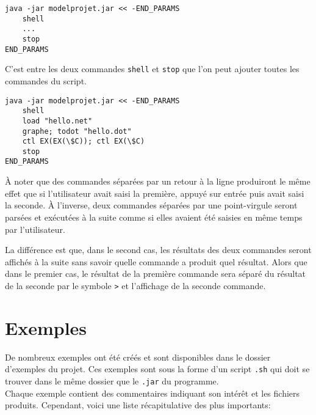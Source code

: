 \documentclass[dvipsnames]{report}
\begin{document}
\begin{verbatim}
java -jar modelprojet.jar << -END_PARAMS
    shell
    ...
    stop
END_PARAMS
\end{verbatim}

C'est entre les deux commandes \texttt{shell} et \texttt{stop} que l'on peut ajouter toutes les commandes du script.

\begin{verbatim}
java -jar modelprojet.jar << -END_PARAMS
    shell
    load "hello.net"
    graphe; todot "hello.dot"
    ctl EX(EX(\$C)); ctl EX(\$C)
    stop
END_PARAMS
\end{verbatim}

\`{A} noter que des commandes séparées par un retour à la ligne produiront le même effet que si l'utilisateur avait saisi la première, appuyé sur entrée puis avait saisi la seconde. \`{A} l'inverse, deux commandes séparées par une point-virgule seront parsées et exécutées à la suite comme si elles avaient été saisies en même temps par l'utilisateur.

La différence est que, dans le second cas, les résultats des deux commandes seront affichés à la suite sans savoir quelle commande a produit quel résultat. Alors que dans le premier cas, le résultat de la première commande sera séparé du résultat de la seconde par le symbole \texttt{>} et l'affichage de la seconde commande.

\section{Exemples}

De nombreux exemples ont été créés et sont disponibles dans le dossier d'exemples du projet. Ces exemples sont sous la forme d'un script \texttt{.sh} qui doit se trouver dans le même dossier que le \texttt{.jar} du programme.\\

Chaque exemple contient des commentaires indiquant son intérêt et les fichiers produits. Cependant, voici une liste récapitulative des plus importants:\\
\end{document}
